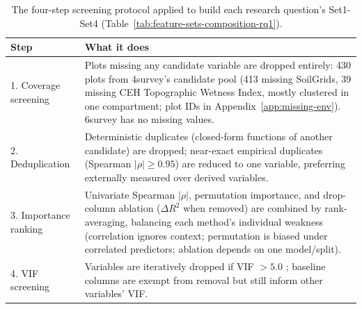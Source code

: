 \documentclass[logo,msc,ai]{infthesis}           %
\begin{document}
\begin{table}[!htbp]
\centering
\scriptsize
\renewcommand{\arraystretch}{1.2}
\begin{tabular}{p{2.6cm}p{9.3cm}}
\toprule
Step & What it does \\
\midrule
1. Coverage screening & Plots missing any candidate variable are dropped entirely: 430 plots from
4survey's candidate pool (413 missing SoilGrids, 39 missing CEH Topographic Wetness Index, mostly
clustered in one compartment; plot IDs in Appendix~\ref{app:missing-env}). 6survey has no missing
values. \\
2. Deduplication & Deterministic duplicates (closed-form functions of another candidate) are
dropped; near-exact empirical duplicates (Spearman $|\rho|\geq0.95$) are reduced to one variable,
preferring externally measured over derived variables. \\
3. Importance ranking & Univariate Spearman $|\rho|$, permutation importance, and drop-column
ablation ($\Delta R^2$ when removed) are combined by rank-averaging, balancing each method's
individual weakness (correlation ignores context; permutation is biased under correlated
predictors; ablation depends on one model/split). \\
4. VIF screening & Variables are iteratively dropped if VIF $>5.0$
\cite{obrien2007Caution_C5_EVAL}; baseline columns are exempt from removal but still inform other
variables' VIF. \\
\bottomrule
\end{tabular}
\caption{The four-step screening protocol applied to build each research question's Set1-Set4
(Table~\ref{tab:feature-sets-composition-rq1}).}
\label{tab:feature-screening-steps}
\end{table}
\end{document}
